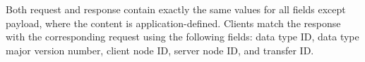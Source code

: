 Both request and response contain exactly the same values for all fields except payload,
where the content is application-defined.
Clients match the response with the corresponding request using the following fields:
data type ID, data type major version number, client node ID, server node ID, and transfer ID.
